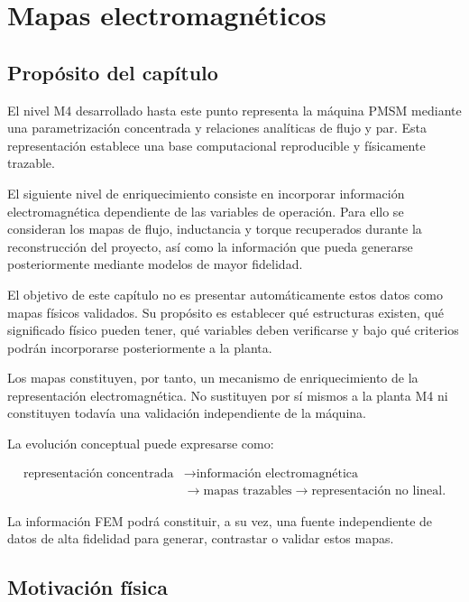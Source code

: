 \section{Mapas electromagnéticos}

\subsection{Propósito del capítulo}

El nivel M4 desarrollado hasta este punto representa la máquina PMSM mediante una parametrización concentrada y relaciones analíticas de flujo y par. Esta representación establece una base computacional reproducible y físicamente trazable.

El siguiente nivel de enriquecimiento consiste en incorporar información electromagnética dependiente de las variables de operación. Para ello se consideran los mapas de flujo, inductancia y torque recuperados durante la reconstrucción del proyecto, así como la información que pueda generarse posteriormente mediante modelos de mayor fidelidad.

El objetivo de este capítulo no es presentar automáticamente estos datos como mapas físicos validados. Su propósito es establecer qué estructuras existen, qué significado físico pueden tener, qué variables deben verificarse y bajo qué criterios podrán incorporarse posteriormente a la planta.

Los mapas constituyen, por tanto, un mecanismo de enriquecimiento de la representación electromagnética. No sustituyen por sí mismos a la planta M4 ni constituyen todavía una validación independiente de la máquina.

La evolución conceptual puede expresarse como:

\begin{equation}
\begin{aligned}
\text{representación concentrada}
&\rightarrow \text{información electromagnética}
\\
&\rightarrow \text{mapas trazables}
\rightarrow \text{representación no lineal}.
\end{aligned}
\end{equation}

La información FEM podrá constituir, a su vez, una fuente independiente de datos de alta fidelidad para generar, contrastar o validar estos mapas.

\subsection{Motivación física}

